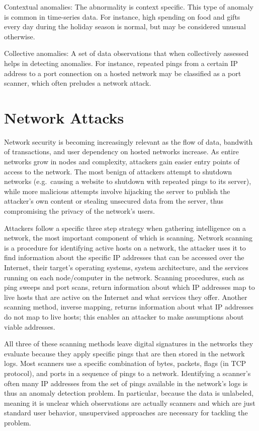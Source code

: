 \documentclass[12pt,twoside]{dukestatscithesis}
\theoremstyle{definition}
\theoremstyle{definition}
\theoremstyle{definition}
\theoremstyle{remark}
\begin{document}
Contextual anomalies: The abnormality is context specific. This type of
anomaly is common in time-series data. For instance, high spending on
food and gifts every day during the holiday season is normal, but may be
considered unusual otherwise.

Collective anomalies: A set of data observations that when collectively
assessed helps in detecting anomalies. For instance, repeated pings from
a certain IP address to a port connection on a hosted network may be
classified as a port scanner, which often preludes a network attack.

\section{Network Attacks}\label{network-attacks}

Network security is becoming increasingly relevant as the flow of data,
bandwith of transactions, and user dependency on hosted networks
increase. As entire networks grow in nodes and complexity, attackers
gain easier entry points of access to the network. The most benign of
attackers attempt to shutdown networks (e.g.~causing a website to
shutdown with repeated pings to its server), while more malicious
attempts involve hijacking the server to publish the attacker's own
content or stealing unsecured data from the server, thus compromising
the privacy of the network's users.

Attackers follow a specific three step strategy when gathering
intelligence on a network, the most important component of which is
scanning. Network scanning is a procedure for identifying active hosts
on a network, the attacker uses it to find information about the
specific IP addresses that can be accessed over the Internet, their
target's operating systems, system architecture, and the services
running on each node/computer in the network. Scanning procedures, such
as ping sweeps and port scans, return information about which IP
addresses map to live hosts that are active on the Internet and what
services they offer. Another scanning method, inverse mapping, returns
information about what IP addresses do not map to live hosts; this
enables an attacker to make assumptions about viable addresses.

All three of these scanning methods leave digital signatures in the
networks they evaluate because they apply specific pings that are then
stored in the network logs. Most scanners use a specific combination of
bytes, packets, flags (in TCP protocol), and ports in a sequence of
pings to a network. Identifying a scanner's often many IP addresses from
the set of pings available in the network's logs is thus an anomaly
detection problem. In particular, because the data is unlabeled, meaning
it is unclear which observations are actually scanners and which are
just standard user behavior, unsupervised approaches are necessary for
tackling the problem.
\end{document}
